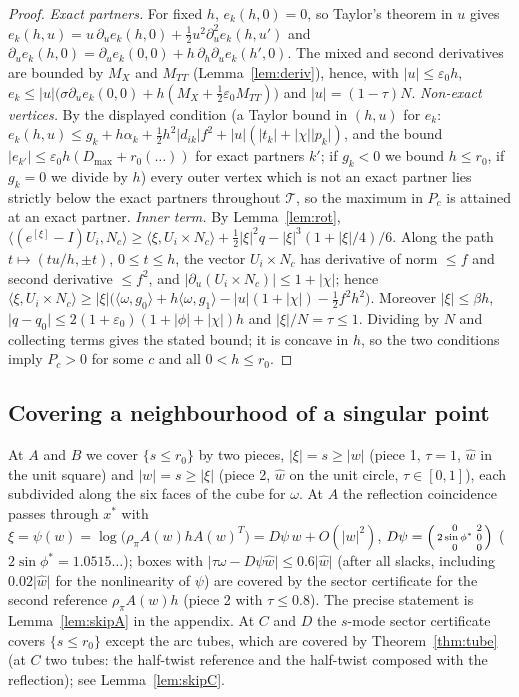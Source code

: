 \documentclass[11pt]{amsart}
\theoremstyle{definition}
\newcommand{\ip}[2]{\langle #1,#2\rangle}
\newcommand{\abs}[1]{\lvert #1\rvert}
\begin{document}
\begin{proof}
\emph{Exact partners.} For fixed $h$, $e_k(h,0)=0$, so Taylor's theorem in $u$ gives
$e_k(h,u)=u\,\partial_ue_k(h,0)+\tfrac12u^2\partial_u^2e_k(h,u')$ and $\partial_ue_k(h,0)=\partial_ue_k(0,0)+h\,\partial_h\partial_ue_k(h',0)$.
The mixed and second derivatives are bounded by $M_X$ and $M_{TT}$ (Lemma~\ref{lem:deriv}), hence, with $\abs u\le\varepsilon_0h$,
$e_k\le\abs u\bigl(\sigma\partial_ue_k(0,0)+h(M_X+\tfrac12\varepsilon_0M_{TT})\bigr)$ and $\abs u=(1-\tau)N$.
\emph{Non-exact vertices.} By the displayed condition (a Taylor bound in $(h,u)$ for $e_k$: $e_k(h,u)\le g_k+h\alpha_k
+\tfrac12h^2\abs{d_{ik}}f^2+\abs u(\abs{t_k}+\abs\chi\abs{p_k})$, and the bound
$\abs{e_{k'}}\le\varepsilon_0h(D_{\max}+r_0(\dots))$ for exact partners $k'$; if $g_k<0$ we bound $h\le r_0$, if $g_k=0$ we divide
by $h$) every outer vertex which is not an exact partner lies strictly below
the exact partners throughout $\mathcal T$, so the maximum in $P_c$ is attained at an exact partner.
\emph{Inner term.} By Lemma~\ref{lem:rot}, $\ip{(e^{[\xi]}-I)U_i}{N_c}\ge\ip\xi{U_i\times N_c}+\tfrac12\abs\xi^2q-\abs\xi^3(1+\abs\xi/4)/6$.
Along the path $t\mapsto(tu/h,\pm t)$, $0\le t\le h$, the vector $U_i\times N_c$ has derivative of norm $\le f$ and second
derivative $\le f^2$, and $\abs{\partial_u(U_i\times N_c)}\le1+\abs\chi$; hence
$\ip\xi{U_i\times N_c}\ge\abs\xi\bigl(\ip\omega{g_0}+h\ip\omega{g_1}-\abs u(1+\abs\chi)-\tfrac12f^2h^2\bigr)$. Moreover
$\abs\xi\le\beta h$, $\abs{q-q_0}\le 2(1+\varepsilon_0)(1+\abs\phi+\abs\chi)h$ and $\abs\xi/N=\tau\le1$. Dividing by $N$ and
collecting terms gives the stated bound; it is concave in $h$, so the two conditions imply $P_c>0$ for some $c$ and all
$0<h\le r_0$.
\end{proof}

\subsection{Covering a neighbourhood of a singular point}
At $A$ and $B$ we cover $\{s\le r_0\}$ by two pieces, $\abs\xi=s\ge\abs w$ (piece 1, $\tau=1$, $\hat w$ in the unit
square) and $\abs w=s\ge\abs\xi$ (piece 2, $\hat w$ on the unit circle, $\tau\in[0,1]$), each subdivided along the six
faces of the cube for $\omega$. At $A$ the reflection coincidence passes through $x^*$ with
$\xi=\psi(w)=\log\bigl(\rho_\pi A(w)hA(w)^T\bigr)=D\psi\,w+O(\abs w^2)$, $D\psi=\begin{psmallmatrix}0&2\\2\sin\phi^*&0\\0&0\end{psmallmatrix}$
($2\sin\phi^*=1.0515\ldots$); boxes with $\abs{\tau\omega-D\psi\hat w}\le0.6\abs{\hat w}$ (after all slacks, including
$0.02\abs{\hat w}$ for the nonlinearity of $\psi$) are covered by the sector certificate for the second
reference $\rho_\pi A(w)h$ (piece 2 with $\tau\le0.8$).
The precise statement is Lemma~\ref{lem:skipA} in the appendix.
At $C$ and $D$ the $s$-mode sector certificate covers $\{s\le r_0\}$ except the arc tubes, which are covered by
Theorem~\ref{thm:tube} (at $C$ two tubes: the half-twist reference and the half-twist composed with the reflection);
see Lemma~\ref{lem:skipC}.
\end{document}

